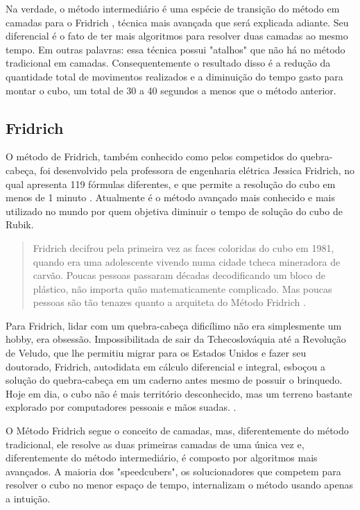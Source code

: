 Na verdade, o método intermediário é uma espécie de transição do método em camadas para o Fridrich \cite{alcantara}, técnica mais avançada que será explicada adiante. Seu diferencial é o fato de ter mais algoritmos para resolver duas camadas ao mesmo tempo. Em outras palavras: essa técnica possui "atalhos" que não há no método tradicional em camadas. Consequentemente o resultado disso é a redução da quantidade total de movimentos realizados e a diminuição do tempo gasto para montar o cubo, um total de 30 a 40 segundos a menos que o método anterior. 



\subsection{Fridrich}

O método de Fridrich, também conhecido como pelos competidos do quebra-cabeça, foi desenvolvido pela professora de engenharia elétrica Jessica Fridrich, no qual apresenta 119 fórmulas diferentes, e que permite a resolução do cubo em menos de 1 minuto \cite{alan}. Atualmente é o método avançado mais conhecido e mais utilizado no mundo por quem objetiva diminuir o tempo de solução do cubo de Rubik.

\begin{quotation}
Fridrich decifrou pela primeira vez as faces coloridas do cubo em 1981, quando era uma adolescente vivendo numa cidade tcheca mineradora de carvão. Poucas pessoas passaram décadas decodificando um bloco de plástico, não importa quão matematicamente complicado. Mas poucas pessoas são tão tenazes quanto a arquiteta do Método Fridrich \cite{bina}.
\end{quotation}

Para Fridrich, lidar com um quebra-cabeça dificílimo não era simplesmente um hobby, era obsessão. Impossibilitada de sair da Tchecoslováquia até a Revolução de Veludo, que lhe permitiu migrar para os Estados Unidos e fazer seu doutorado, Fridrich, autodidata em cálculo diferencial e integral, esboçou a solução do quebra-cabeça em um caderno antes mesmo de possuir o brinquedo. Hoje em dia, o cubo não é mais território desconhecido, mas um terreno bastante explorado por computadores pessoais e mãos suadas. \cite{bina}.


O Método Fridrich segue o conceito de camadas, mas, diferentemente do método tradicional, ele resolve as duas primeiras camadas de uma única vez e, diferentemente do método intermediário, é composto por algoritmos mais avançados. A maioria dos "speedcubers", os solucionadores que competem para resolver o cubo no menor espaço de tempo, internalizam o método usando apenas a intuição. 

